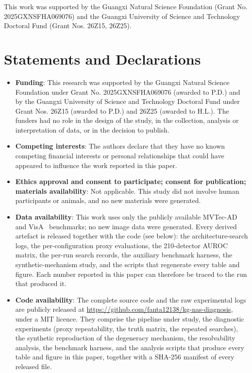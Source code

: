 \documentclass[pdflatex,iicol,sn-mathphys-num]{sn-jnl}
\begin{document}
\backmatter


This work was supported by the Guangxi Natural Science Foundation (Grant No. 2025GXNSFHA069076) and the Guangxi University of Science and Technology Doctoral Fund (Grant Nos. 26Z15, 26Z25).

\section*{Statements and Declarations}

\begin{itemize}
\item \textbf{Funding}: This research was supported by the Guangxi Natural Science Foundation under Grant No. 2025GXNSFHA069076 (awarded to P.D.) and by the Guangxi University of Science and Technology Doctoral Fund under Grant Nos. 26Z15 (awarded to P.D.) and 26Z25 (awarded to H.L.). The funders had no role in the design of the study, in the collection, analysis or interpretation of data, or in the decision to publish.

\item \textbf{Competing interests}: The authors declare that they have no known competing financial interests or personal relationships that could have appeared to influence the work reported in this paper.

\item \textbf{Ethics approval and consent to participate; consent for publication; materials availability}: Not applicable. This study did not involve human participants or animals, and no new materials were generated.

\item \textbf{Data availability}: This work uses only the publicly available MVTec-AD~\cite{bergmann2021mvtec} and VisA~\cite{zou2022visa} benchmarks; no new image data were generated. Every derived artefact is released together with the code (see below): the architecture-search logs, the per-configuration proxy evaluations, the 210-detector AUROC matrix, the per-run search records, the auxiliary benchmark harness, the synthetic-mechanism study, and the scripts that regenerate every table and figure. Each number reported in this paper can therefore be traced to the run that produced it.

\item \textbf{Code availability}: The complete source code and the raw experimental logs are publicly released at \url{https://github.com/fanta12138/kg-nas-diagnosis}, under a MIT licence. They comprise the pipeline under study, the diagnostic experiments (proxy repeatability, the truth matrix, the repeated searches), the synthetic reproduction of the degeneracy mechanism, the resolvability analysis, the benchmark harness, and the analysis scripts that produce every table and figure in this paper, together with a SHA-256 manifest of every released file.


\end{itemize}
\end{document}
